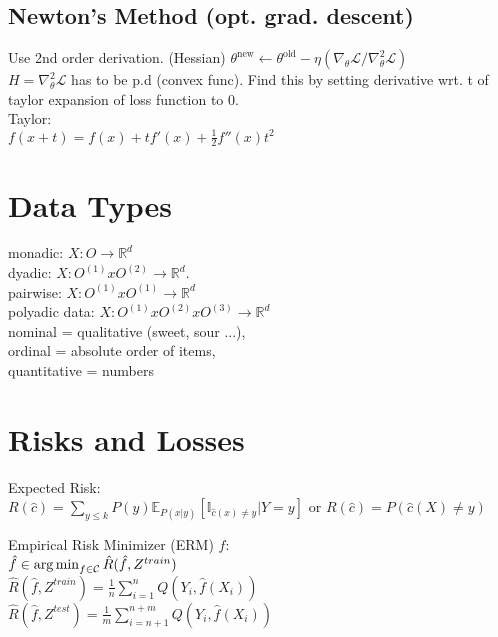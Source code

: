 \subsection*{Newton's Method (opt. grad. descent)}
Use 2nd order derivation. (Hessian)
$\theta^{\mathrm{new}}\leftarrow\theta^{\mathrm{old}}-\eta(\nabla_{\theta}\mathcal{L}/\nabla^2_{\theta}\mathcal{L})$\\
$H=\nabla^2_{\theta}\mathcal{L}$ has to be p.d (convex func).
Find this by setting derivative wrt. t of taylor expansion of loss function to 0. \\
Taylor:\\
$f(x+t)=f(x)+t f'(x)+\frac{1}{2}f''(x)t^2$

\section*{Data Types}
monadic: $X: O \rightarrow \mathbb{R}^d$ \\
dyadic: $X: O^{(1)} x O^{(2)} \rightarrow \mathbb{R}^d $.\\
pairwise: $X: O^{(1)} x O^{(1)} \rightarrow \mathbb{R}^d$ \\
polyadic data: $X: O^{(1)} x O^{(2)} x O^{(3)} \rightarrow \mathbb{R}^d $ \\
nominal = qualitative (sweet, sour ...),\\
ordinal = absolute order of items, \\
quantitative = numbers
\section*{Risks and Losses}
Expected Risk:\\ $R(\hat c) = \sum_{y \leq  k}P(y)\mathbb{E}_{P(x|y)}[\mathbb{I}_{{\hat c(x) \neq y}}| Y = y]$ or 
$R(\hat c) = P(\hat c (X) \neq y)$

Empirical Risk Minimizer (ERM) $\hat{f}$:\\
$\hat{f} \in \operatorname*{arg\,min}_{f \in \mathcal{C}} \hat{R}(\hat{f}, Z^{train})$\\
$\hat{R}(\hat{f}, Z^{train}) = \frac{1}{n} \sum_{i=1}^n Q(Y_i, \hat{f}(X_i))$\\
$\hat{R}(\hat{f}, Z^{test}) = \frac{1}{m} \sum_{i=n+1}^{n+m} Q(Y_i, \hat{f}(X_i))$